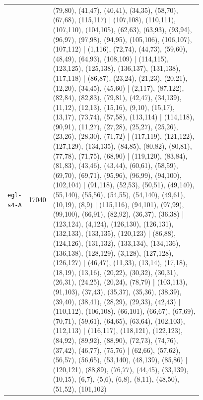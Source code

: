 \begin{landscape}
\begin{longtable}{lr>{\tiny\raggedright\arraybackslash}p{0.78\linewidth}}
\texttt{egl-s4-A} & 17040 & (79,80), (41,47), (40,41), (34,35), (58,70), (67,68), (115,117) | (107,108), (110,111), (107,110), (104,105), (62,63), (63,93), (93,94), (96,97), (97,98), (94,95), (105,106), (106,107), (107,112) | (1,116), (72,74), (44,73), (59,60), (48,49), (64,93), (108,109) | (114,115), (123,125), (125,138), (136,137), (131,138), (117,118) | (86,87), (23,24), (21,23), (20,21), (12,20), (34,45), (45,60) | (2,117), (87,122), (82,84), (82,83), (79,81), (42,47), (34,139), (11,12), (12,13), (15,16), (9,10), (15,17), (13,17), (73,74), (57,58), (113,114) | (114,118), (90,91), (11,27), (27,28), (25,27), (25,26), (23,26), (28,30), (71,72) | (117,119), (121,122), (127,129), (134,135), (84,85), (80,82), (80,81), (77,78), (71,75), (68,90) | (119,120), (83,84), (81,83), (43,46), (43,44), (60,61), (58,59), (69,70), (69,71), (95,96), (96,99), (94,100), (102,104) | (91,118), (52,53), (50,51), (49,140), (55,140), (55,56), (54,55), (54,140), (49,61), (10,19), (8,9) | (115,116), (94,101), (97,99), (99,100), (66,91), (82,92), (36,37), (36,38) | (123,124), (4,124), (126,130), (126,131), (132,133), (133,135), (120,123) | (86,88), (124,126), (131,132), (133,134), (134,136), (136,138), (128,129), (3,128), (127,128), (126,127) | (46,47), (11,33), (13,14), (17,18), (18,19), (13,16), (20,22), (30,32), (30,31), (26,31), (24,25), (20,24), (78,79) | (103,113), (91,103), (37,43), (35,37), (35,36), (38,39), (39,40), (38,41), (28,29), (29,33), (42,43) | (110,112), (106,108), (66,101), (66,67), (67,69), (70,71), (59,61), (64,65), (63,64), (102,103), (112,113) | (116,117), (118,121), (122,123), (84,92), (89,92), (88,90), (72,73), (74,76), (37,42), (46,77), (75,76) | (62,66), (57,62), (56,57), (56,65), (53,140), (48,139), (85,86) | (120,121), (88,89), (76,77), (44,45), (33,139), (10,15), (6,7), (5,6), (6,8), (8,11), (48,50), (51,52), (101,102) \\[2pt]

\end{longtable}
\end{landscape}
